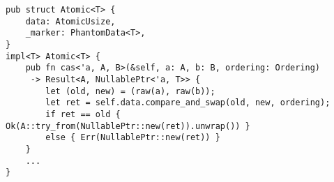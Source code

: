 \begin{lstlisting}[caption=Excerpt of \mc{Atomic}s definitions (Trait bounds omitted for brevity),
label=lst:atomic]
pub struct Atomic<T> {
    data: AtomicUsize,
    _marker: PhantomData<T>,
}
impl<T> Atomic<T> {
    pub fn cas<'a, A, B>(&self, a: A, b: B, ordering: Ordering)
     -> Result<A, NullablePtr<'a, T>> {
        let (old, new) = (raw(a), raw(b));
        let ret = self.data.compare_and_swap(old, new, ordering);
        if ret == old { Ok(A::try_from(NullablePtr::new(ret)).unwrap()) }
        else { Err(NullablePtr::new(ret)) }
    }
    ...
}

\end{lstlisting}
